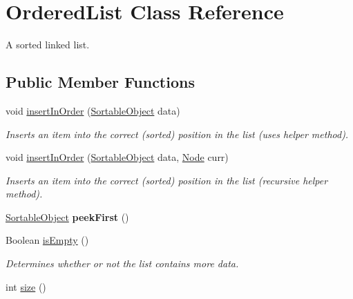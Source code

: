\hypertarget{class_ordered_list}{
\section{OrderedList Class Reference}
\label{class_ordered_list}
}
A sorted linked list.  


\subsection*{Public Member Functions}
\begin{CompactItemize}
\item 
void \hyperlink{class_ordered_list_f5ee8de5685273568603e1cb63e19195}{insertInOrder} (\hyperlink{class_sortable_object}{SortableObject} data)
\begin{CompactList}\small\item\em Inserts an item into the correct (sorted) position in the list (uses helper method). \item\end{CompactList}\item 
void \hyperlink{class_ordered_list_8d86cb6f2ce66b3565929493e055cc09}{insertInOrder} (\hyperlink{class_sortable_object}{SortableObject} data, \hyperlink{class_node}{Node} curr)
\begin{CompactList}\small\item\em Inserts an item into the correct (sorted) position in the list (recursive helper method). \item\end{CompactList}\item 
\hypertarget{class_ordered_list_92eb9493a7ce5c3265237a3e6995dff2}{
\hyperlink{class_sortable_object}{SortableObject} \textbf{peekFirst} ()}
\label{class_ordered_list_92eb9493a7ce5c3265237a3e6995dff2}

\item 
\hypertarget{class_ordered_list_a114c9a80c3f1ef5b034cb3bd40a763b}{
Boolean \hyperlink{class_ordered_list_a114c9a80c3f1ef5b034cb3bd40a763b}{isEmpty} ()}
\label{class_ordered_list_a114c9a80c3f1ef5b034cb3bd40a763b}

\begin{CompactList}\small\item\em Determines whether or not the list contains more data. \item\end{CompactList}\item 
\hypertarget{class_ordered_list_237f65c54c7e71dc8350c60e51c09c3f}{
int \hyperlink{class_ordered_list_237f65c54c7e71dc8350c60e51c09c3f}{size} ()}
\label{class_ordered_list_237f65c54c7e71dc8350c60e51c09c3f}


\end{CompactItemize}
